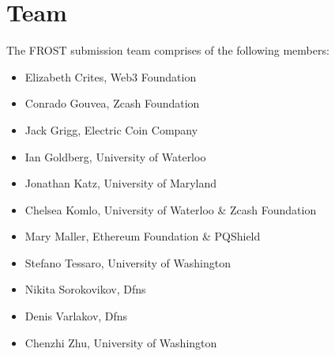 \section{Team}

The FROST submission team comprises of the following members:

\begin{itemize}
\item Elizabeth Crites, Web3 Foundation
\item Conrado Gouvea, Zcash Foundation
\item Jack Grigg, Electric Coin Company
\item Ian Goldberg, University of Waterloo
\item Jonathan Katz, University of Maryland
\item Chelsea Komlo, University of Waterloo \& Zcash Foundation 
\item Mary Maller, Ethereum Foundation \& PQShield
\item Stefano Tessaro, University of Washington
\item Nikita Sorokovikov, Dfns
\item Denis Varlakov, Dfns
\item Chenzhi Zhu, University of Washington
\end{itemize}
